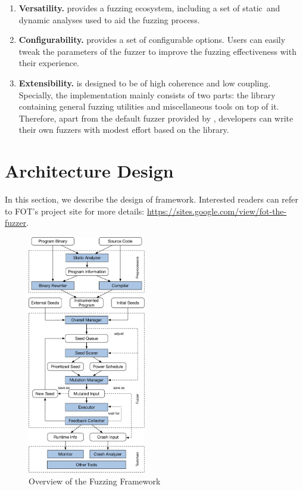 \begin{enumerate}[(1)]


\item  \textbf{Versatility.}
{\FOT} provides a fuzzing ecosystem, including a set of static~and dynamic analyses used to aid the fuzzing process.


\item \textbf{Configurability.}
{\FOT} provides a set of configurable options.
Users can easily tweak the parameters of the fuzzer to improve the fuzzing effectiveness with their experience.

\item \textbf{Extensibility.}
{\FOT} is designed to be of high coherence and low coupling. Specially, the implementation mainly consists of two parts: the library containing general fuzzing utilities and miscellaneous tools on top of it. Therefore, apart from the default fuzzer provided by {\FOT}, developers can write their own fuzzers with modest effort based on the library.
\end{enumerate}







 

\section{Architecture Design}\label{sec:details}

In this section, we describe the design of {\FOT} framework.
Interested readers can refer to {FOT}'s project site for more details:
\url{https://sites.google.com/view/fot-the-fuzzer}.


\begin{figure}[t]
	\centering
	\includegraphics[width=0.46\textwidth]{res/fot/FOT_overview}
	\vspace{-5pt}
	\caption{Overview of the {\FOT} Fuzzing Framework}
	\label{fig:fot_workflow}
\end{figure}




